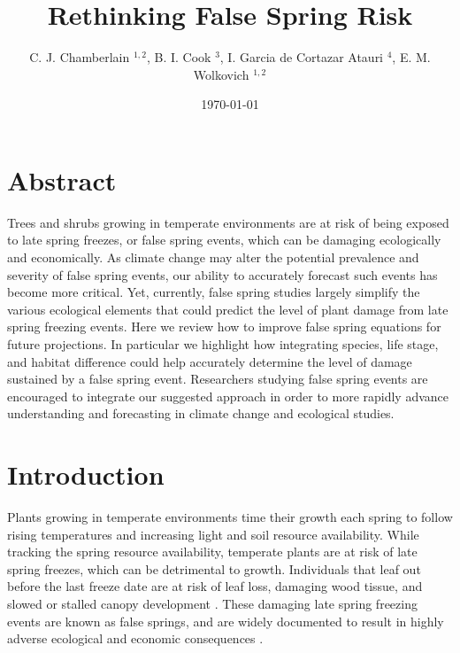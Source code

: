 \documentclass{article}\usepackage[]{graphicx}\usepackage[]{color}
\begin{document}
\title{Rethinking False Spring Risk}
\author{C. J. Chamberlain $^{1,2}$, B. I. Cook $^{3}$, I. Garcia de Cortazar Atauri $^{4}$, E. M. Wolkovich $^{1,2}$}
\date{\today}
\maketitle 
 

\renewcommand{\thetable}{\arabic{table}}
\renewcommand{\thefigure}{\arabic{figure}}
\renewcommand{\labelitemi}{$-$}



\section{Abstract}
Trees and shrubs growing in temperate environments are at risk of being exposed to late spring freezes, or false spring events, which can be damaging ecologically and economically. As climate change may alter the potential prevalence and severity of false spring events, our ability to accurately forecast such events has become more critical. Yet, currently, false spring studies largely simplify the various ecological elements that could predict the level of plant damage from late spring freezing events. Here we review how to improve false spring equations for future projections. In particular we highlight how integrating species, life stage, and habitat difference could help accurately determine the level of damage sustained by a false spring event. Researchers studying false spring events are encouraged to integrate our suggested approach in order to more rapidly advance understanding and forecasting in climate change and ecological studies.

\section{Introduction}

Plants growing in temperate environments time their growth each spring to follow rising temperatures and increasing light and soil resource availability. While tracking the spring resource availability, temperate plants are at risk of late spring freezes, which can be detrimental to growth. Individuals that leaf out before the last freeze date are at risk of leaf loss, damaging wood tissue, and slowed or stalled canopy development \citep{Gu2008, Hufkens2012}. These damaging late spring freezing events are known as false springs, and are widely documented to result in highly adverse ecological and economic consequences \citep{Knudson2012, Ault2013}.
\end{document}

